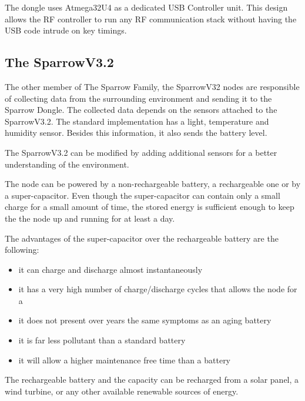 The dongle uses Atmega32U4 as a dedicated USB Controller unit. This design allows the RF controller to run any RF communication stack without having the USB code intrude on key timings.\cite{voinescu2013lightweight}


\subsection{The SparrowV3.2}
 
 
The other member of The Sparrow Family, the SparrowV32 nodes are responsible of collecting data from the surrounding environment and sending it to the Sparrow Dongle. The collected data depends on the sensors attached to the SparrowV3.2. The standard implementation has a light, temperature and humidity sensor. Besides this information, it also sends the battery level.

The SparrowV3.2 can be modified by adding additional sensors for a better understanding of the environment.

The node can be powered by a non-rechargeable battery, a rechargeable one or by a super-capacitor. Even though the super-capacitor can contain only a small charge for a small amount of time, the stored energy is sufficient enough to keep the the node up and running for at least a day. 

The advantages of the super-capacitor over the rechargeable battery are the following:

\begin{itemize}
\item it can charge and discharge almost instantaneously 
\item it has a very high number of charge/discharge cycles that allows the node for a 
\item it does not present over years the same symptoms as an aging battery
\item it is far less pollutant than a standard battery
\item it will allow a higher maintenance free time than a battery

\end{itemize}

The rechargeable battery and the capacity can be recharged from a solar panel, a wind turbine, or any other available renewable sources of energy.
